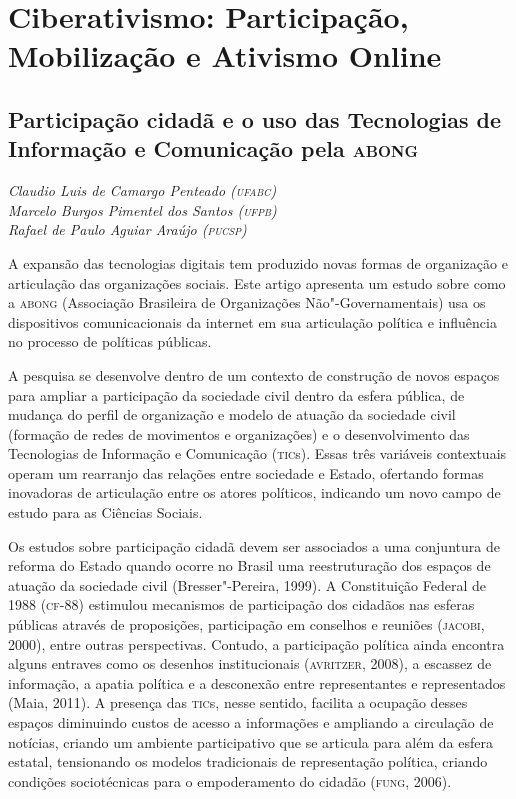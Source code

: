 \part{Ciberativismo: Participação, Mobilização e Ativismo Online}

\chapter*{Participação cidadã e o uso das Tecnologias de Informação e Comunicação pela \textsc{abong}}

\begin{flushright}
\emph{Claudio Luis de Camargo Penteado (\textsc{ufabc})\\Marcelo Burgos Pimentel
dos Santos (\textsc{ufpb})\\Rafael de Paulo Aguiar Araújo (\textsc{pucsp})}
\end{flushright}


A expansão das tecnologias digitais tem produzido novas formas de
organização e articulação das organizações sociais. Este artigo
apresenta um estudo sobre como a \textsc{abong} (Associação Brasileira de
Organizações Não"-Governamentais) usa os dispositivos comunicacionais da
internet em sua articulação política e influência no processo de
políticas públicas.

A pesquisa se desenvolve dentro de um contexto de construção de novos
espaços para ampliar a participação da sociedade civil dentro da esfera
pública, de mudança do perfil de organização e modelo de atuação da
sociedade civil (formação de redes de movimentos e organizações) e o
desenvolvimento das Tecnologias de Informação e Comunicação (\textsc{tic}s).
Essas três variáveis contextuais operam um rearranjo das relações entre
sociedade e Estado, ofertando formas inovadoras de articulação entre os
atores políticos, indicando um novo campo de estudo para as Ciências
Sociais.

Os estudos sobre participação cidadã devem ser associados a uma
conjuntura de reforma do Estado quando ocorre no Brasil uma
reestruturação dos espaços de atuação da sociedade civil
(Bresser"-Pereira, 1999). A Constituição Federal de 1988 (\textsc{cf}-88)
estimulou mecanismos de participação dos cidadãos nas esferas públicas
através de proposições, participação em conselhos e reuniões (\textsc{jacobi},
2000), entre outras perspectivas. Contudo, a participação política ainda
encontra alguns entraves como os desenhos institucionais (\textsc{avritzer},
2008), a escassez de informação, a apatia política e a desconexão entre
representantes e representados (Maia, 2011). A presença das \textsc{tic}s, nesse
sentido, facilita a ocupação desses espaços diminuindo custos de acesso
a informações e ampliando a circulação de notícias, criando um ambiente
participativo que se articula para além da esfera estatal, tensionando
os modelos tradicionais de representação política, criando condições
sociotécnicas para o empoderamento do cidadão (\textsc{fung}, 2006).

